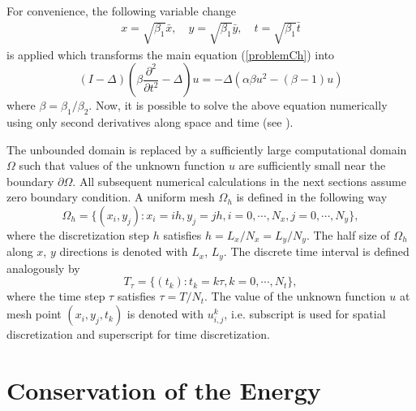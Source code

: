 \documentclass[%
 aip,
cp,  %
 amsmath,amssymb,%
 reprint,%
]{revtex4-2}
\newcommand{\be}{\begin{equation}}
\newcommand{\ee}{\end{equation}}
\newcommand{\rf}[1]{(\ref{#1})}
\begin{document}
For convenience, the following variable change 
\begin{align}
x = \sqrt{\beta_1} \bar{x}, \quad y = \sqrt{\beta_1} \bar{y}, \quad t = \sqrt{\beta_1} \bar{t} \nonumber
\end{align}
is applied which transforms the main equation \rf{problemCh} into
\be\label{problemVC}
(I-\Delta)( \beta\frac{\partial^2}{\partial t^2} - \Delta)u= 
-\Delta(\alpha \beta u^2 - (\beta - 1 )u)
\ee
where $\beta = \beta_1/\beta_2$. Now, it is possible to solve the above equation numerically using only second derivatives along space and time (see \cite{ref25}).

The unbounded domain is replaced by a sufficiently large computational domain $\Omega$ such that values of the unknown function $u$ are sufficiently small near the boundary $\partial \Omega$. All subsequent numerical calculations in the next sections assume zero boundary condition. A uniform mesh $\Omega_h$ is defined in the following way
$$
\Omega_h = \{(x_i,y_j): x_i = ih, y_j = jh, i = 0,\cdots ,N_x, j = 0,\cdots , N_y \},
$$
where the discretization step $h$ satisfies $h = L_x/N_x = L_y/N_y$. The half size of $\Omega_h$ along $x$, $y$ directions is denoted with $L_x$, $L_y$. The discrete time interval is defined analogously by
$$
T_{\tau} = \{(t_k): t_k = k\tau, k = 0,\cdots ,N_t \},
$$
where the time step $\tau$ satisfies $\tau = T/N_t$. The value of the unknown function $u$ at mesh point $(x_i,y_j,t_k)$ is denoted with $u_{i,j}^k$, i.e. subscript is used for spatial discretization and superscript for time discretization.
\section{Conservation of the Energy}
\end{document}
